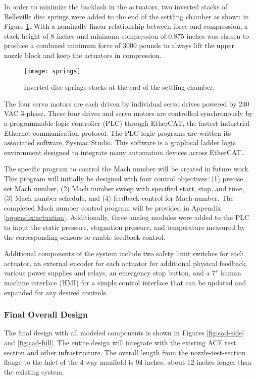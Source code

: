 In order to minimize the backlash in the actuators, two inverted stacks of Belleville disc springs were added to the end of the settling chamber as shown in Figure \ref{fig:springs}. With a nominally linear relationship between force and compression, a stack height of 8 inches and minimum compression of 0.875 inches was chosen to produce a combined minimum force of 3000 pounds to always lift the upper nozzle block and keep the actuators in compression.

\begin{figure}[ht!]
    \centering
    \texttt{[image: springs]}
    \caption{Inverted disc springs stacks at the end of the settling chamber.}
    \label{fig:springs}
\end{figure}

The four servo motors are each driven by individual servo drives powered by 240 VAC 3-phase. These four drives and servo motors are controlled synchronously by a programmable logic controller (PLC) through EtherCAT, the fastest industrial Ethernet communication protocol. The PLC logic programs are written its associated software, Sysmac Studio. This software is a graphical ladder logic environment designed to integrate many automation devices across EtherCAT.

The specific program to control the Mach number will be created in future work. This program will initially be designed with four control objectives: (1) precise set Mach number, (2) Mach number sweep with specified start, stop, and time, (3) Mach number schedule, and (4) feedback-control for Mach number. The completed Mach number control program will be provided in Appendix \ref{appendix:actuation}. Additionally, three analog modules were added to the PLC to input the static pressure, stagnation pressure, and temperature measured by the corresponding sensors to enable feedback-control. 

Additional components of the system include two safety limit switches for each actuator, an external encoder for each actuator for additional physical feedback, various power supplies and relays, an emergency stop button, and a 7" human machine interface (HMI) for a simple control interface that can be updated and expanded for any desired controls.

\subsubsection*{Final Overall Design}

The final design with all modeled components is shown in Figures \ref{fig:cad-side} and \ref{fig:cad-full}. The entire design will integrate with the existing ACE test section and other infrastructure. The overall length from the nozzle-test-section flange to the inlet of the 4-way manifold is 94 inches, about 12 inches longer than the existing system.

